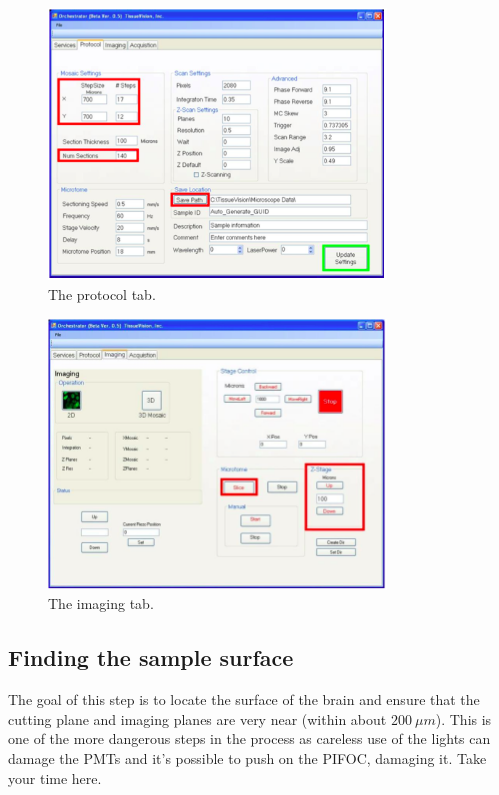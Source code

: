 \documentclass[paper=a4, fontsize=11pt]{scrartcl} %
\numberwithin{equation}{section} %
\numberwithin{figure}{section} %
\numberwithin{table}{section} %
\begin{document}
\begin{figure}[h]
\centering
\includegraphics[width=0.8\textwidth,natwidth=467,natheight=375]{protocol_tab.png}
\caption{The protocol tab.}
\label{fig:prot_tab}
\end{figure}

\begin{figure}[h]
\centering
\includegraphics[width=0.8\textwidth,natwidth=679,natheight=543]{imaging_tab.png}
\caption{The imaging tab.}
\label{fig:im_tab}
\end{figure}
\clearpage

\subsection{Finding the sample surface}
The goal of this step is to locate the surface of the brain and ensure that the cutting plane and imaging planes are very 
near (within about $200~\mu m$). This is one of the more dangerous steps in the process as careless use of the lights can damage the 
PMTs and it's possible to push on the PIFOC, damaging it. Take your time here. 
\end{document}
